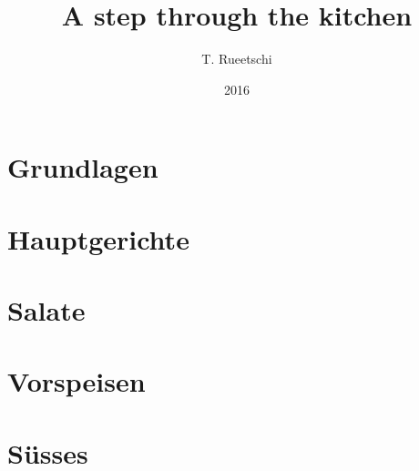 \documentclass[
  a5paper,
  ngerman,
  10pt,
]{spcookbook}
\title{A step through the kitchen}
\author{T. Rueetschi}
\date{2016}
\begin{document}
\Titlepage%
\tableofcontents

\section{Grundlagen}


\section{Hauptgerichte}









\section{Salate}


\section{Vorspeisen}



\section{S\"usses}


\newpage


\end{document}
